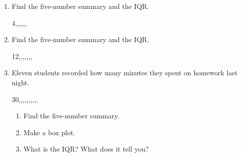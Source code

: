 \documentclass[11pt]{article}
\newif\ifkey
\newcommand{\ans}[1]{\ifkey\leavevmode{\color{red!75!black}#1}\fi}
\newcommand{\bplot}[5]{%
  \draw[thick] (#1,1.0) -- (#2,1.0);
  \draw[thick] (#4,1.0) -- (#5,1.0);
  \draw[thick] (#1,0.75) -- (#1,1.25);
  \draw[thick] (#5,0.75) -- (#5,1.25);
  \draw[thick,fill=gray!20] (#2,0.55) rectangle (#4,1.45);
  \draw[very thick] (#3,0.55) -- (#3,1.45);}
\begin{document}
\newpage
\begin{enumerate}[leftmargin=1.5em,itemsep=1em]

\item Find the five-number summary and the IQR.
\begin{center}4,,,,,,\end{center}
\ans{In order: 1, 3, 4, \fbox{6}, 7, 8, 9. \quad Min 1, Q1 3, Median 6, Q3 8, Max 9. \quad IQR = 8 $-$ 3 = 5}
\vspace{6em}

\item Find the five-number summary and the IQR.
\begin{center}12,,,,,,,\end{center}
\ans{In order: 10, 11, 12, 14, 15, 16, 18, 20. \quad Median = (14 + 15) $\div$ 2 = 14.5\\
Lower half 10, 11, 12, 14: Q1 = 11.5. \quad Upper half 15, 16, 18, 20: Q3 = 17.\\
Min 10, Q1 11.5, Median 14.5, Q3 17, Max 20. \quad IQR = 5.5}
\vspace{6em}

\item Eleven students recorded how many minutes they spent on homework last night.
\begin{center}30,,,,,,,,,,\end{center}
\begin{enumerate}[itemsep=1em]
  \item Find the five-number summary.

  \ans{5, 10, 10, 15, 20, \fbox{25}, 30, 30, 40, 45, 60. \quad Min 5, Q1 10, Median 25, Q3 40, Max 60}
  \vspace{5em}
  \item Make a box plot.
  \begin{center}
  \end{center}
  \item What is the IQR? What does it tell you?


\end{enumerate}
\end{enumerate}
\end{document}
